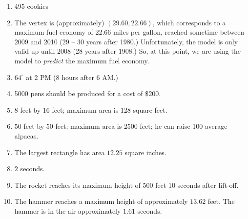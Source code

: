 \begin{enumerate}
\setcounter{enumi}{\value{HW}}


\item 495 cookies

\item The vertex is (approximately) $(29.60, 22.66)$, which corresponds to a maximum fuel economy of 22.66 miles per gallon, reached sometime between 2009 and 2010 (29 -- 30 years after 1980.)  Unfortunately, the model is only valid up until 2008 (28 years after 1908.)  So, at this point, we are using the model to \textit{predict} the maximum fuel economy.



\item  $64^{\circ}$ at 2 PM (8 hours after 6 AM.)

\item  5000 pens should be produced for a cost of $\$200$.

\item 8 feet by 16 feet; maximum area is 128 square feet.

\item 50 feet by 50 feet;  maximum area is 2500 feet;  he can raise 100 average alpacas. 

\item The largest rectangle has area $12.25$ square inches.


\item  $2$ seconds.


\item  The rocket reaches its maximum height of $500$ feet $10$ seconds after lift-off.


\item  The hammer reaches a maximum height of approximately $13.62$ feet.  The hammer is in the air approximately $1.61$ seconds.  

\setcounter{HW}{\value{enumi}}
\end{enumerate}


